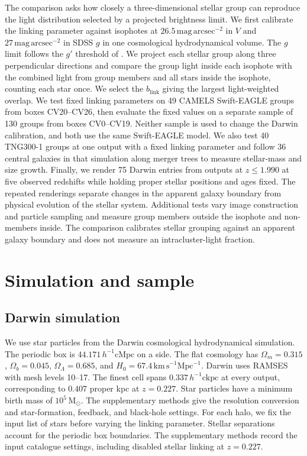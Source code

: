 \documentclass[usenatbib]{mnras}
\begin{document}
The comparison asks how closely a three-dimensional stellar group can
reproduce the light distribution selected by a projected brightness limit.
We first calibrate the linking parameter against isophotes at
$26.5\,\mathrm{mag\,arcsec}^{-2}$ in $V$ and
$27\,\mathrm{mag\,arcsec}^{-2}$ in SDSS $g$ in one cosmological
hydrodynamical volume. The $g$ limit follows the $g'$ threshold of
\citet{montenegro2025}. We project each stellar group along three
perpendicular directions and compare the group light inside each
isophote with the combined light from group members and all stars inside
the isophote, counting each star once. We select the $b_{\mathrm{link}}$ giving the largest
light-weighted overlap.
We test fixed linking parameters on 49 CAMELS Swift-EAGLE groups from
boxes CV20--CV26, then evaluate the fixed values on a separate sample of
130 groups from boxes CV0--CV19. Neither sample is used to change the
Darwin calibration, and both use the same Swift-EAGLE model. We also test
40 TNG300-1 groups at one output with a fixed linking parameter and follow
36 central galaxies in that simulation along merger trees to measure
stellar-mass and size growth. Finally,
we render 75 Darwin entries from outputs at $z\leq1.990$ at five
observed redshifts while holding proper stellar positions and ages fixed.
The repeated renderings separate changes in the apparent galaxy boundary
from physical evolution of the stellar system. Additional tests vary image
construction and particle sampling and measure group members outside
the isophote and non-members inside. The comparison calibrates stellar
grouping against an apparent galaxy boundary and does not
measure an intracluster-light fraction.

\section{Simulation and sample}
\label{sec:sample}

\subsection{Darwin simulation}
\label{sec:volume}

We use star particles from the Darwin cosmological hydrodynamical
simulation. The periodic box is $44.171\,h^{-1}\mathrm{cMpc}$ on a side.
The flat cosmology has $\Omega_{m}=0.315$, $\Omega_{b}=0.045$, $\Omega_{\Lambda}=0.685$,
and $H_{0}=67.4\,\mathrm{km\,s}^{-1}\mathrm{Mpc}^{-1}$.
Darwin uses RAMSES \citep{teyssier2002} with mesh levels 10--17.
The finest cell spans
$0.337\,h^{-1}\mathrm{ckpc}$ at every output, corresponding to
$0.407$ proper kpc at $z=0.227$. Star particles have a minimum birth
mass of $10^{5}\,\mathrm{M}_{\odot}$. The supplementary methods give the
resolution conversion and star-formation, feedback, and black-hole
settings. For each halo, we fix the input list of stars before varying
the linking parameter. Stellar separations account for the periodic
box boundaries.
The supplementary methods record the input catalogue settings,
including disabled stellar linking at $z=0.227$.
\end{document}
